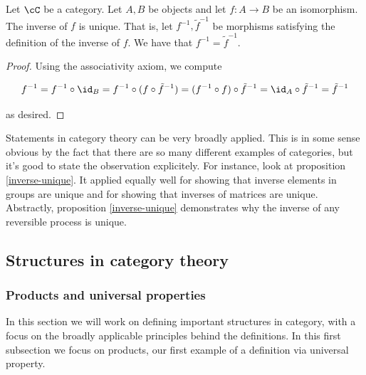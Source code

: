 \begin{prop}
\label{inverse-unique}
Let $\cC$ be a category. Let $A,B$ be objects and let $f:A\to B$ be an isomorphism. The inverse of $f$ is unique. That is, let $f^{-1},\tilde{f}^{-1}$ be morphisms satisfying the definition of the inverse of $f$. We have that $f^{-1}=\tilde{f}^{-1}$.
\end{prop}
\begin{proof} Using the associativity axiom, we compute

$$f^{-1}=f^{-1}\circ \id _{B} = f^{-1}\circ (f \circ \tilde{f}^{-1})=(f^{-1}\circ f)\circ \tilde{f}^{-1}=\id_A \circ \tilde{f}^{-1}=\tilde{f}^{-1}$$

as desired.
\end{proof}

\begin{rem} Statements in category theory can be very broadly applied. This is in some sense obvious by the fact that there are so many different examples of categories, but it's good to state the observation explicitely. For instance, look at proposition \ref{inverse-unique}. It applied equally well for showing that inverse elements in groups are unique and for showing that inverses of matrices are unique. Abstractly, proposition \ref{inverse-unique} demonstrates why the inverse of any reversible process is unique.
\end{rem}

\subsection{Structures in category theory}

\subsubsection{Products and universal properties}

In this section we will work on defining important structures in category, with a focus on the broadly applicable principles behind the definitions. In this first subsection we focus on products, our first example of a definition via universal property.

